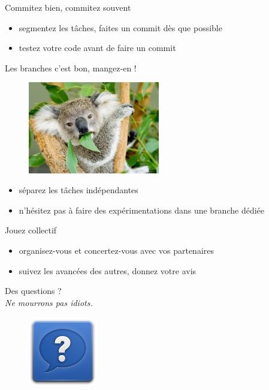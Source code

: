 \documentclass{beamer}
\begin{document}
\begin{frame}{Commitez bien, commitez souvent}

	\begin{itemize}
		\item segmentez les tâches, faites un commit dès que possible
		\item testez votre code avant de faire un commit
	\end{itemize}
	
\end{frame}

\begin{frame}{Les branches c'est bon, mangez-en !}
	\begin{figure}
		\centering
		\includegraphics[height=4cm]{img/koala-eating-leaf}
	\end{figure}

	\begin{itemize}
		\item séparez les tâches indépendantes
		\item n'hésitez pas à faire des expérimentations dans une branche dédiée
	\end{itemize}
	
\end{frame}

\begin{frame}{Jouez collectif}

	\begin{itemize}
		\item organisez-vous et concertez-vous avec vos partenaires
		\item suivez les avancées des autres, donnez votre avis
	\end{itemize}
	
\end{frame}


\begin{frame}
		\begin{center}
 		\Large{Des questions ?}\\
 		{\small \textit{Ne mourrons pas idiots.}}
	\end{center}

	\begin{figure}
		\centering
		\includegraphics[height=3cm]{img/help}
	\end{figure}
\end{frame}
\end{document}

